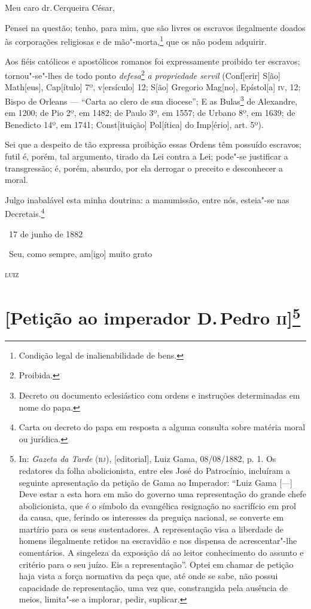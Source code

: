 \noindent{}Meu caro dr.\,Cerqueira César,

Pensei na questão; tenho, para mim, que são livres os escravos
ilegalmente doados às corporações religiosas e de mão"-morta,\footnote{
  Condição legal de inalienabilidade de bens.} que os não podem
adquirir.

Aos fiéis católicos e apostólicos romanos foi expressamente proibido ter
escravos; tornou"-se"-lhes de todo ponto \emph{defesa}\footnote{
  Proibida.} \emph{a propriedade servil} (Conf{[}erir{]} S{[}ão{]}
Math{[}eus{]}, Cap{[}ítulo{]} 7º, v{[}ersículo{]} 12; S{[}ão{]} Gregorio
Mag{[}no{]}, Epístol{[}a{]} \textsc{iv}, 12; Bispo de Orleans --- ``Carta ao
clero de sua diocese''; E as Bulas\footnote{Decreto ou documento
  eclesiástico com ordens e instruções determinadas em nome do papa.}
de Alexandre, em 1200; de Pio 2º, em 1482; de Paulo
3º, em 1557; de Urbano 8º, em 1639; de Benedicto 14º, em 1741;
Const{[}ituição{]} Pol{[}ítica{]} do Imp{[}ério{]}, art. 5º).

Sei que a despeito de tão expressa proibição essas Ordens têm possuído
escravos; futil é, porém, tal argumento, tirado da Lei contra a Lei;
pode"-se justificar a transgressão; é, porém, absurdo, por ela derrogar o
preceito e desconhecer a moral.

Julgo inabalável esta minha doutrina: a manumissão, entre nós, esteia"-se
nas Decretais.\footnote{Carta ou decreto do papa em resposta a alguma
  consulta sobre matéria moral ou jurídica.}

\hfill\ 17 de junho de 1882\bigskip

\hfill\ Seu, como sempre, am{[}igo{]} muito grato

\hfill\textsc{luiz}

\chapter{{[}Petição ao imperador D.\,Pedro \textsc{ii}{]}\footnote[*]{In:
  \emph{Gazeta da Tarde} (\textsc{rj}), {[}editorial{]}, Luiz Gama, 08/08/1882,
  p. 1. Os redatores da folha abolicionista, entre eles José do
  Patrocínio, incluíram a seguinte apresentação da petição de Gama ao
  Imperador: ``Luiz Gama {[}---{]} Deve estar a esta hora em mão do
  governo uma representação do grande chefe abolicionista, que é o
  símbolo da evangélica resignação no sacrifício em prol da causa, que,
  ferindo os interesses da preguiça nacional, se converte em martírio
  para os seus sustentadores.
  A representação visa a liberdade de homens ilegalmente retidos na
  escravidão e nos dispensa de acrescentar"-lhe comentários.
  A singeleza da exposição dá ao leitor conhecimento do assunto e
  critério para o seu juízo.
  Eis a representação''. Optei em chamar de petição haja vista a força
  normativa da peça que, até onde se sabe, não possui capacidade de
  representação, uma vez que, constrangida pela ausência de meios,
  limita"-se a implorar, pedir, suplicar.}}

